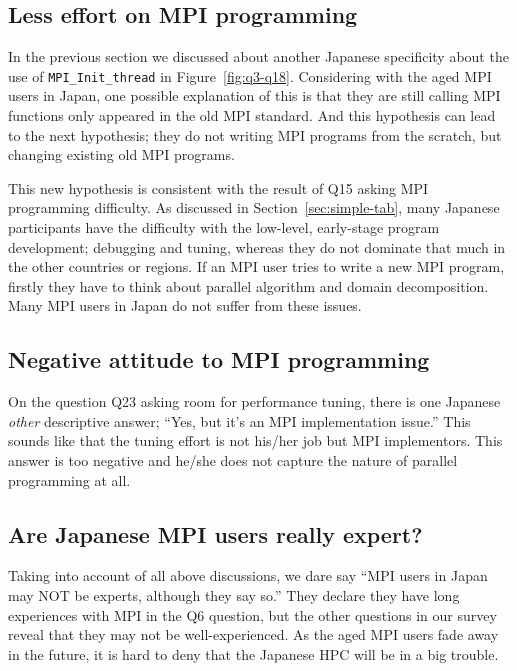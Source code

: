 \documentclass[submit,techrep,noauthor,english]{ipsj}
\begin{document}
\subsection{Less effort on MPI programming}

In the previous section we discussed about another Japanese
specificity about the use of {\tt MPI\_Init\_thread} in
Figure~\ref{fig:q3-q18}. Considering with the aged MPI users in Japan,
one possible explanation of this is that they are still calling MPI
functions only appeared in the old MPI standard. And this hypothesis
can lead to the next hypothesis; they do not writing MPI programs from
the scratch, but changing existing old MPI programs.

This new hypothesis is consistent with the result of Q15 asking MPI
programming difficulty. As discussed in Section~\ref{sec:simple-tab},
many Japanese participants have the difficulty with the low-level,
early-stage program development; debugging and tuning, whereas they do
not dominate that much in the other countries or regions. If an MPI user 
tries to write a new MPI program, firstly they have to think about
parallel algorithm and domain decomposition.  Many MPI users in
Japan do not suffer from these issues.

\subsection{Negative attitude to MPI programming}

On the question Q23 asking room for performance tuning, there is one
Japanese {\it other} descriptive answer; ``Yes, but it’s an MPI
implementation issue.'' This sounds like that the tuning effort is not
his/her job but MPI implementors. This answer is too negative and
he/she does not capture the nature of parallel programming at all.

\subsection{Are Japanese MPI users really expert?}

Taking into account of all above discussions, we dare say ``MPI users
in Japan may NOT be experts, although they say so.'' They declare they
have long experiences with MPI in the Q6 question, but the other
questions in our survey reveal that they may not be
well-experienced. As the aged MPI users fade away in the future, it is
hard to deny that the Japanese HPC will be in a big trouble. 
\end{document}
